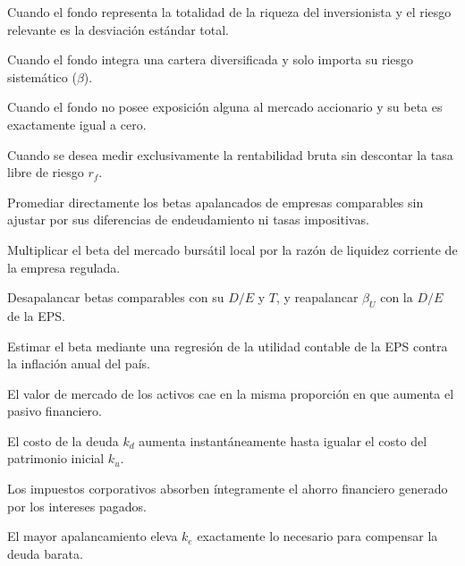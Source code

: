 \begin{opts}
    \item Cuando el fondo representa la totalidad de la riqueza del inversionista y el riesgo relevante es la desviación estándar total.
    \item Cuando el fondo integra una cartera diversificada y solo importa su riesgo sistemático ($\beta$).
    \item Cuando el fondo no posee exposición alguna al mercado accionario y su beta es exactamente igual a cero.
    \item Cuando se desea medir exclusivamente la rentabilidad bruta sin descontar la tasa libre de riesgo $r_f$.
\end{opts}

\begin{opts}
    \item Promediar directamente los betas apalancados de empresas comparables sin ajustar por sus diferencias de endeudamiento ni tasas impositivas.
    \item Multiplicar el beta del mercado bursátil local por la razón de liquidez corriente de la empresa regulada.
    \item Desapalancar betas comparables con su $D/E$ y $T$, y reapalancar $\beta_U$ con la $D/E$ de la EPS.
    \item Estimar el beta mediante una regresión de la utilidad contable de la EPS contra la inflación anual del país.
\end{opts}

\begin{opts}
    \item El valor de mercado de los activos cae en la misma proporción en que aumenta el pasivo financiero.
    \item El costo de la deuda $k_d$ aumenta instantáneamente hasta igualar el costo del patrimonio inicial $k_u$.
    \item Los impuestos corporativos absorben íntegramente el ahorro financiero generado por los intereses pagados.
    \item El mayor apalancamiento eleva $k_e$ exactamente lo necesario para compensar la deuda barata.
\end{opts}

